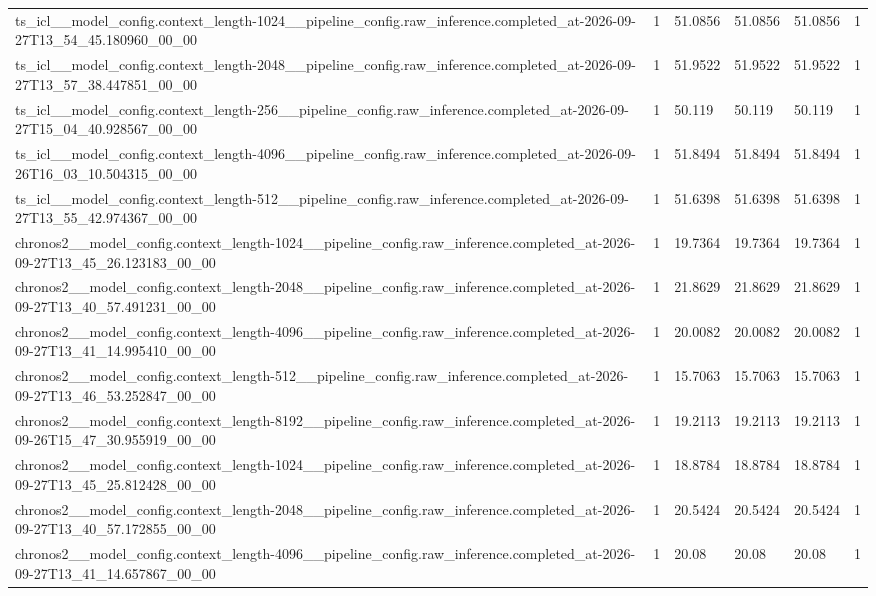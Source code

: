 \begin{tabular}{llllll}
ts\_icl\_\_model\_config.context\_length-1024\_\_pipeline\_config.raw\_inference.completed\_at-2026-09-27T13\_54\_45.180960\_00\_00 & 1 & 51.0856 & 51.0856 & 51.0856 & 1 \\
ts\_icl\_\_model\_config.context\_length-2048\_\_pipeline\_config.raw\_inference.completed\_at-2026-09-27T13\_57\_38.447851\_00\_00 & 1 & 51.9522 & 51.9522 & 51.9522 & 1 \\
ts\_icl\_\_model\_config.context\_length-256\_\_pipeline\_config.raw\_inference.completed\_at-2026-09-27T15\_04\_40.928567\_00\_00 & 1 & 50.119 & 50.119 & 50.119 & 1 \\
ts\_icl\_\_model\_config.context\_length-4096\_\_pipeline\_config.raw\_inference.completed\_at-2026-09-26T16\_03\_10.504315\_00\_00 & 1 & 51.8494 & 51.8494 & 51.8494 & 1 \\
ts\_icl\_\_model\_config.context\_length-512\_\_pipeline\_config.raw\_inference.completed\_at-2026-09-27T13\_55\_42.974367\_00\_00 & 1 & 51.6398 & 51.6398 & 51.6398 & 1 \\
chronos2\_\_model\_config.context\_length-1024\_\_pipeline\_config.raw\_inference.completed\_at-2026-09-27T13\_45\_26.123183\_00\_00 & 1 & 19.7364 & 19.7364 & 19.7364 & 1 \\
chronos2\_\_model\_config.context\_length-2048\_\_pipeline\_config.raw\_inference.completed\_at-2026-09-27T13\_40\_57.491231\_00\_00 & 1 & 21.8629 & 21.8629 & 21.8629 & 1 \\
chronos2\_\_model\_config.context\_length-4096\_\_pipeline\_config.raw\_inference.completed\_at-2026-09-27T13\_41\_14.995410\_00\_00 & 1 & 20.0082 & 20.0082 & 20.0082 & 1 \\
chronos2\_\_model\_config.context\_length-512\_\_pipeline\_config.raw\_inference.completed\_at-2026-09-27T13\_46\_53.252847\_00\_00 & 1 & 15.7063 & 15.7063 & 15.7063 & 1 \\
chronos2\_\_model\_config.context\_length-8192\_\_pipeline\_config.raw\_inference.completed\_at-2026-09-26T15\_47\_30.955919\_00\_00 & 1 & 19.2113 & 19.2113 & 19.2113 & 1 \\
chronos2\_\_model\_config.context\_length-1024\_\_pipeline\_config.raw\_inference.completed\_at-2026-09-27T13\_45\_25.812428\_00\_00 & 1 & 18.8784 & 18.8784 & 18.8784 & 1 \\
chronos2\_\_model\_config.context\_length-2048\_\_pipeline\_config.raw\_inference.completed\_at-2026-09-27T13\_40\_57.172855\_00\_00 & 1 & 20.5424 & 20.5424 & 20.5424 & 1 \\
chronos2\_\_model\_config.context\_length-4096\_\_pipeline\_config.raw\_inference.completed\_at-2026-09-27T13\_41\_14.657867\_00\_00 & 1 & 20.08 & 20.08 & 20.08 & 1 \\

\end{tabular}
